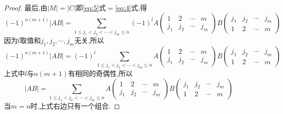 \begin{proof}
  最后,由$|M|=|C|$即\eqref{eq:5}式$=$\eqref{eq:4}式,得
  \begin{equation*}
    (-1)^{n(m+1)}|AB|=\sum\limits_{1\le j_1<j_2<\cdots<j_m\le n}
  (-1)^{l}
  A\left(\begin{smallmatrix}
      1 & 2 & \cdots & m \\
      j_1 & j_2 & \cdots & j_m \end{smallmatrix}\right)
  B\left(\begin{smallmatrix}
      j_1 & j_2 & \cdots & j_m\\
      1 & 2 & \cdots & m \end{smallmatrix}\right)
\end{equation*}
因为$l$取值和$j_1 , j_2 , \cdots , j_m$无关,所以
  \begin{equation*}
    (-1)^{n(m+1)}|AB| =(-1)^{l}\sum\limits_{1\le j_1<j_2<\cdots<j_m\le n}
  A\left(\begin{smallmatrix}
      1 & 2 & \cdots & m \\
      j_1 & j_2 & \cdots & j_m \end{smallmatrix}\right)
  B\left(\begin{smallmatrix}
      j_1 & j_2 & \cdots & j_m\\
      1 & 2 & \cdots & m \end{smallmatrix}\right)
  \end{equation*}
  上式中$l$与$n(m+1)$有相同的奇偶性,所以
  \[
    |AB|=\sum\limits_{1\le j_1<j_2<\cdots<j_m\le n}
  A\left(\begin{smallmatrix}
      1 & 2 & \cdots & m \\
      j_1 & j_2 & \cdots & j_m \end{smallmatrix}\right)
  B\left(\begin{smallmatrix}
      j_1 & j_2 & \cdots & j_m\\
      1 & 2 & \cdots & m \end{smallmatrix}\right)
\]
当$m=n$时,上式右边只有一个组合.
\end{proof}
